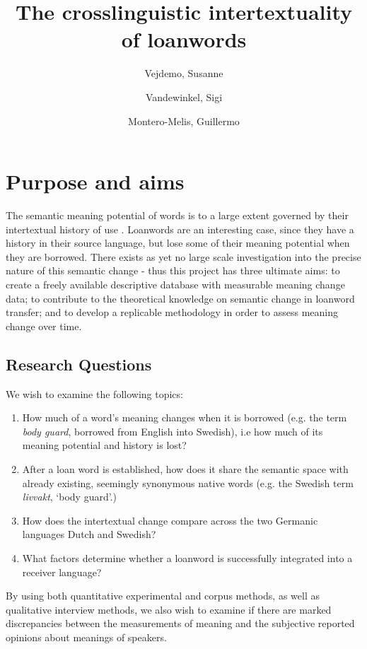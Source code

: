 \documentclass[a4paper]{article}
\title{The crosslinguistic intertextuality of loanwords}
\author{Vejdemo, Susanne \and Vandewinkel, Sigi \and Montero-Melis, Guillermo}
\begin{document}
\maketitle
\thispagestyle{fancy} %

\section{Purpose and aims}
The semantic meaning potential of words is to a large extent governed by their intertextual history of use \citep[see][]{Linell2005,Traugott2001}.
Loanwords are an interesting case, since they have a history in their source language, but lose some of their meaning potential when they are borrowed.
There exists as yet no large scale investigation into the precise nature of this semantic change - thus this project has three ultimate aims: to create a freely available descriptive database with measurable meaning change data; 
to contribute to the theoretical knowledge on semantic change in loanword transfer;
and to develop a replicable methodology in order to assess meaning change over time.

\subsection{Research Questions}

We wish to examine the following topics:
%
\begin{enumerate}
	\item  How much of a word's meaning changes when it is borrowed (e.g. the term \emph{body guard}, borrowed from English into Swedish), i.e how much of its meaning potential and history is lost?
	\item  After a loan word is established, how does it share the semantic space with already existing, seemingly synonymous native words (e.g. the Swedish term \emph{livvakt}, `body guard'.)
	\item How does the intertextual change compare across the two Germanic languages Dutch and Swedish?
	\item What factors determine whether a loanword is successfully integrated into a receiver language?
\end{enumerate}
%
By using both quantitative experimental and corpus methods, as well as qualitative interview methods, we also wish to examine if there are marked discrepancies between the measurements of meaning and the subjective reported opinions about meanings of speakers.
\end{document}
